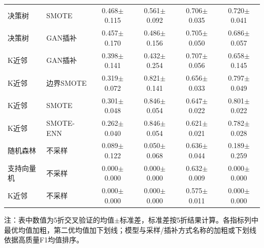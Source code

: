 \begin{table}[htbp]
{\begin{tabular}{llcccc}
决策树 & SMOTE & 0.468$\pm$0.115 & 0.561$\pm$0.092 & 0.706$\pm$0.035 & 0.720$\pm$0.041 \\
决策树 & GAN插补 & 0.457$\pm$0.170 & 0.486$\pm$0.156 & 0.705$\pm$0.050 & 0.686$\pm$0.057 \\
K近邻 & GAN插补 & 0.398$\pm$0.141 & 0.432$\pm$0.254 & 0.707$\pm$0.056 & 0.658$\pm$0.145 \\
K近邻 & 边界SMOTE & 0.319$\pm$0.072 & 0.821$\pm$0.141 & 0.656$\pm$0.033 & 0.797$\pm$0.049 \\
K近邻 & SMOTE & 0.301$\pm$0.048 & 0.846$\pm$0.054 & 0.647$\pm$0.022 & 0.801$\pm$0.022 \\
K近邻 & SMOTE-ENN & 0.262$\pm$0.040 & 0.846$\pm$0.054 & 0.621$\pm$0.021 & 0.782$\pm$0.028 \\
随机森林 & 不采样 & 0.089$\pm$0.122 & 0.050$\pm$0.068 & 0.636$\pm$0.044 & 0.189$\pm$0.259 \\
支持向量机 & 不采样 & 0.000$\pm$0.000 & 0.000$\pm$0.000 & 0.632$\pm$0.009 & 0.000$\pm$0.000 \\
K近邻 & 不采样 & 0.000$\pm$0.000 & 0.000$\pm$0.000 & 0.575$\pm$0.011 & 0.000$\pm$0.000 \\
\bottomrule
\end{tabular}
}%
\vspace{2pt}
\parbox{\textwidth}{\footnotesize 注：表中数值为5折交叉验证的均值$\pm$标准差，标准差按5折结果计算。各指标列中最优均值加粗，第二优均值加下划线；模型与采样/插补方式名称的加粗或下划线依据高质量F1均值排序。}
\end{table}
